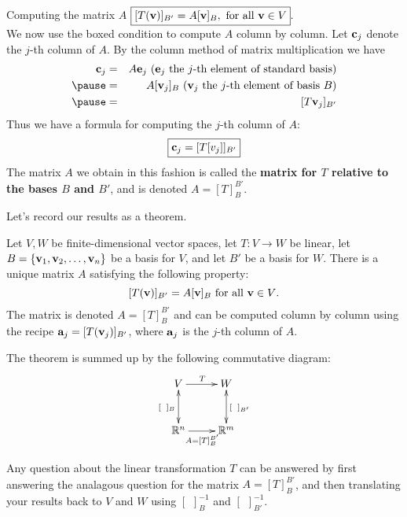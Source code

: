 \begin{frame}{Computing the matrix $A$}
\footnotesize
$
\hfill
\boxed{[T(\boldv)]_{B'}=A[\boldv]_B, \text{ for all $\boldv\in V$}}.
\hfill
$
\\
We now use the boxed condition to compute $A$ column by column. Let ${\mathbf c}_j$ denote the $j$-th column of $A$. 
\bpause By the column method of matrix multiplication we have 
\begin{eqnarray*}
\boldc_j&=&A\bolde_j \text{ ($\bolde_j$ the $j$-th element of standard basis)}\\
\pause&=&A[\boldv_j]_B \text{ ($\boldv_j$ the $j$-th element of basis $B$)}\\
\pause&=&[T\boldv_j]_{B'}
\end{eqnarray*}
\pause
Thus we have a formula for computing the $j$-th column of $A$:
\[
\boxed{{\mathbf c}_j=[T[v_j]]_{B'}}
\]
\pause The matrix $A$ we obtain in this fashion is called the {\bf matrix for $T$ relative to the bases $B$ and $B'$}, and is denoted $A=[T]_{B}^{B'}$. 
\end{frame}
\begin{frame}
Let's record our results as a theorem. 
\begin{theorem}
Let $V, W$ be finite-dimensional vector spaces, let $T\colon V\rightarrow W$ be linear, let $B=\{{\mathbf v}_1,{\mathbf v}_2,\dots, {\mathbf v}_n\}$ be a basis for $V$, and let $B'$ be a basis for $W$. There is a \alert{unique} matrix $A$ satisfying the following property: 
\[
[T({\mathbf v})]_{B'}=A[{\mathbf v}]_B \text{ for all ${\mathbf v}\in V$}.
\]
The matrix is denoted $A=[T]_B^{B'}$ and can be computed column by column using the recipe ${\mathbf a}_j=[T({\mathbf v}_j)]_{B'}$, where ${\mathbf a}_j$ is the $j$-th column of $A$. 
\end{theorem}
\pause
The theorem is summed up by the following \alert{commutative diagram}:
\[
\xymatrix@C=2pc @R=2.5pc{
V\ar[r]^{T} \ar@{<->}[d]_{[\hspace{5pt}]_B}& W \ar@{<->}[d]^{[\hspace{5pt}]_{B'}}\\
\R^n\ar[r]_{A=[T]_B^{B'}}& \R^m
}
\] 
\pause
\begin{corollary}
Any question about the \alert{linear transformation} $T$ can be answered by first answering the analagous question for the \alert{matrix}  $A=[T]_B^{B'}$, and then translating your results back to $V$ and $W$ using $[\hspace{5pt}]_B^{-1}$ and $[\hspace{5pt}]_{B'}^{-1}$. 
\end{corollary}
\end{frame}
